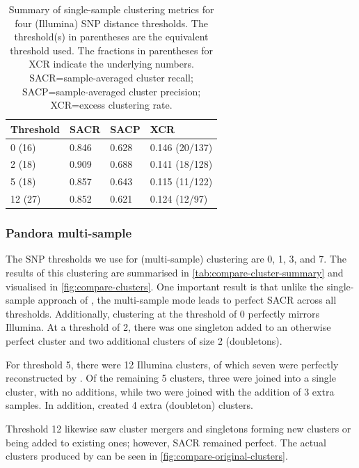\begin{table}
\centering
\begin{tabular}{@{}llll@{}}
\toprule
Threshold & SACR  & SACP  & XCR            \\ \midrule
0 (16)    & 0.846 & 0.628 & 0.146 (20/137) \\
2 (18)    & 0.909 & 0.688 & 0.141 (18/128) \\
5 (18)    & 0.857 & 0.643 & 0.115 (11/122) \\
12 (27)   & 0.852 & 0.621 & 0.124 (12/97)  \\ \bottomrule
\end{tabular}
\caption{Summary of \pandora{} single-sample clustering metrics for four (Illumina) SNP distance thresholds. The threshold(s) in parentheses are the \ont{} equivalent threshold used. The fractions in parentheses for XCR indicate the underlying numbers. SACR=sample-averaged cluster recall; SACP=sample-averaged cluster precision; XCR=excess clustering rate.}
\label{tab:map-cluster-summary}
\end{table}

\subsubsection{Pandora multi-sample}

The SNP thresholds we use for \compare{} (multi-sample) clustering are 0, 1, 3, and 7. The results of this clustering are summarised in \autoref{tab:compare-cluster-summary} and visualised in \autoref{fig:compare-clusters}. One important result is that unlike the single-sample approach of \pandora{}, the multi-sample mode leads to perfect SACR across all thresholds. Additionally, clustering at the threshold of 0 perfectly mirrors Illumina. At a threshold of 2, there was one singleton added to an otherwise perfect cluster and two additional clusters of size 2 (doubletons). 

For threshold 5, there were 12 Illumina clusters, of which seven were perfectly reconstructed by \pandora{}. Of the remaining 5 clusters, three were joined into a single cluster, with no additions, while two were joined with the addition of 3 extra samples. In addition, \compare{} created 4 extra (doubleton) clusters.

Threshold 12 likewise saw cluster mergers and singletons forming new clusters or being added to existing ones; however, SACR remained perfect. The actual clusters produced by \compare{} can be seen in \autoref{fig:compare-original-clusters}.


